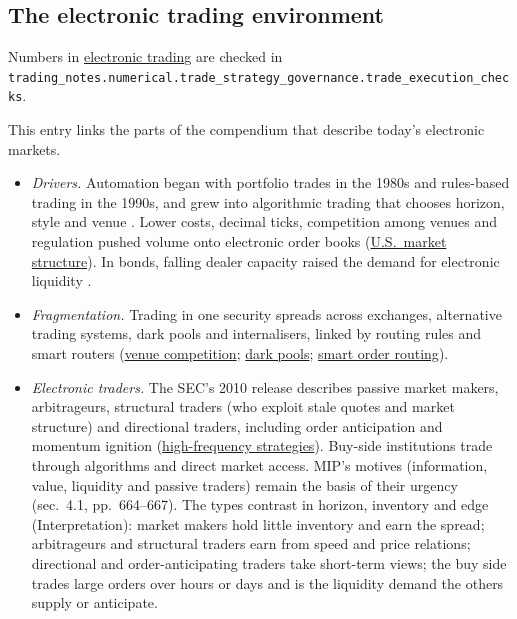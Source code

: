 \subsection{The electronic trading environment}

Numbers in \hyperref[def:electronic-trading-environment]{electronic trading} are checked in \nolinkurl{trading_notes.numerical.trade_strategy_governance.trade_execution_checks}.

\begin{qfdefinition}\label{def:electronic-trading-environment}
 This entry links the parts of the compendium that describe today's electronic markets.
\begin{itemize}
\item \emph{Drivers.} Automation began with portfolio trades in the 1980s and rules-based trading in the 1990s, and grew into algorithmic trading that chooses horizon, style and venue \citep[chap.~10, sec.~5.3, pp.~670--673]{managing-investment-portfolios-2007}. Lower costs, decimal ticks, competition among venues and regulation pushed volume onto electronic order books (\hyperref[rule:us-equity-market-structure]{U.S.\ market structure}). In bonds, falling dealer capacity raised the demand for electronic liquidity \citep[chap.~44, pp.~1098--1099]{s7-fabozzifixed}.
\item \emph{Fragmentation.} Trading in one security spreads across exchanges, alternative trading systems, dark pools and internalisers, linked by routing rules and smart routers (\hyperref[mech:venue-competition-fragmentation]{venue competition}; \hyperref[def:dark-pools-crossing]{dark pools}; \hyperref[def:smart-order-routing]{smart order routing}).
\item \emph{Electronic traders.} The SEC's 2010 release describes passive market makers, arbitrageurs, structural traders (who exploit stale quotes and market structure) and directional traders, including order anticipation and momentum ignition (\hyperref[def:hft-strategies]{high-frequency strategies}). Buy-side institutions trade through algorithms and direct market access. MIP's motives (information, value, liquidity and passive traders) remain the basis of their urgency (sec.~4.1, pp.~664--667). The types contrast in horizon, inventory and edge (Interpretation): market makers hold little inventory and earn the spread; arbitrageurs and structural traders earn from speed and price relations; directional and order-anticipating traders take short-term views; the buy side trades large orders over hours or days and is the liquidity demand the others supply or anticipate.

\end{itemize}
\end{qfdefinition}
